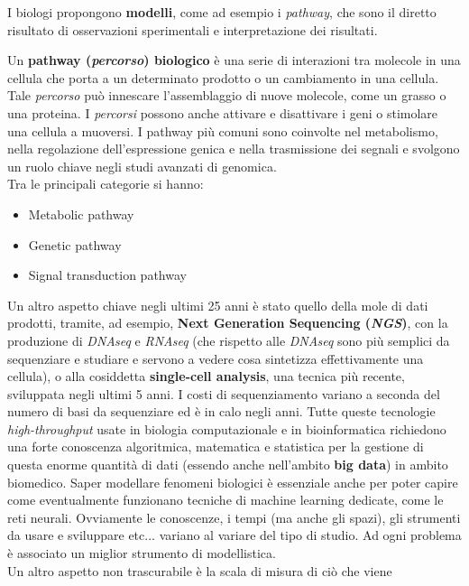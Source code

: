\documentclass[a4paper,12pt, oneside]{book}
\begin{document}
I biologi propongono \textbf{modelli}, come ad esempio i \textit{pathway}, che
sono il diretto risultato di osservazioni sperimentali e interpretazione dei
risultati.
\begin{definizione}
  Un \textbf{pathway (\emph{percorso}) biologico} è una serie di interazioni
  tra molecole in una cellula che porta a un determinato prodotto o un
  cambiamento in una cellula. Tale \emph{percorso} può innescare
  l'assemblaggio di nuove molecole, come un grasso o una proteina. I
  \emph{percorsi} possono anche attivare e disattivare i geni o stimolare una
  cellula a muoversi. I pathway più comuni sono coinvolte nel metabolismo, nella
  regolazione dell'espressione genica e nella trasmissione dei segnali e
  svolgono un ruolo chiave negli studi avanzati di genomica.\\
  Tra le principali categorie si hanno:
  \begin{itemize}
    \item Metabolic pathway
    \item Genetic pathway
    \item Signal transduction pathway
  \end{itemize}
\end{definizione}
Un altro aspetto chiave negli ultimi 25 anni è stato quello della
mole di dati prodotti, tramite, ad esempio, \textbf{Next Generation Sequencing
  (\textit{NGS})}, con la produzione di \textit{DNAseq} e \textit{RNAseq} (che
rispetto alle \textit{DNAseq} sono più semplici da sequenziare e studiare e
servono a vedere cosa sintetizza effettivamente una cellula), o
alla cosiddetta \textbf{single-cell analysis}, una tecnica più recente,
sviluppata negli ultimi 5 anni. I costi di sequenziamento variano a seconda
del numero di basi da sequenziare ed è in calo negli anni.
Tutte queste tecnologie 
\textit{high-throughput} usate in biologia computazionale e in bioinformatica
richiedono una forte conoscenza algoritmica, matematica e statistica per la
gestione di questa enorme quantità di dati (essendo anche nell'ambito
\textbf{big data}) in ambito biomedico. Saper modellare fenomeni biologici è
essenziale anche per poter capire come eventualmente funzionano tecniche di
machine learning dedicate, come le reti neurali. Ovviamente le conoscenze, i
tempi (ma anche gli spazi), gli strumenti da usare e sviluppare etc$\ldots$ variano al
variare del tipo di studio. Ad ogni problema è associato un miglior strumento di
modellistica.\\ 
Un altro aspetto non trascurabile è la scala di misura di ciò che viene
\end{document}
